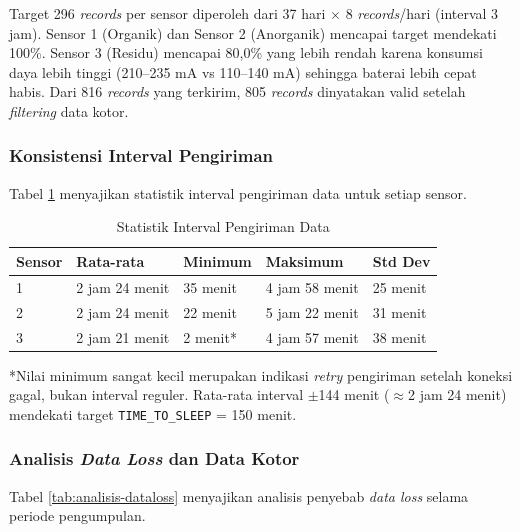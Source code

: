 Target 296 \textit{records} per sensor diperoleh dari 37 hari $\times$ 8 \textit{records}/hari (interval 3 jam). Sensor 1 (Organik) dan Sensor 2 (Anorganik) mencapai target mendekati 100\%. Sensor 3 (Residu) mencapai 80,0\% yang lebih rendah karena konsumsi daya lebih tinggi (210--235 mA vs 110--140 mA) sehingga baterai lebih cepat habis. Dari 816 \textit{records} yang terkirim, 805 \textit{records} dinyatakan valid setelah \textit{filtering} data kotor.

\subsubsection{Konsistensi Interval Pengiriman}

Tabel \ref{tab:statistik-interval} menyajikan statistik interval pengiriman data untuk setiap sensor.

\begin{table}[H]
  \caption{Statistik Interval Pengiriman Data}
  \label{tab:statistik-interval}
  \centering
  \begin{tabular}{| l | l | l | l | l |}
    \hline
    \textbf{Sensor} & \textbf{Rata-rata} & \textbf{Minimum} & \textbf{Maksimum} & \textbf{Std Dev} \\
    \hline
    1 & 2 jam 24 menit & 35 menit & 4 jam 58 menit & 25 menit \\
    \hline
    2 & 2 jam 24 menit & 22 menit & 5 jam 22 menit & 31 menit \\
    \hline
    3 & 2 jam 21 menit & 2 menit* & 4 jam 57 menit & 38 menit \\
    \hline
  \end{tabular}
\end{table}

*Nilai minimum sangat kecil merupakan indikasi \textit{retry} pengiriman setelah koneksi gagal, bukan interval reguler. Rata-rata interval $\pm$144 menit ($\approx$2 jam 24 menit) mendekati target \texttt{TIME\_TO\_SLEEP} = 150 menit.

\subsubsection{Analisis \textit{Data Loss} dan Data Kotor}

Tabel \ref{tab:analisis-dataloss} menyajikan analisis penyebab \textit{data loss} selama periode pengumpulan.


